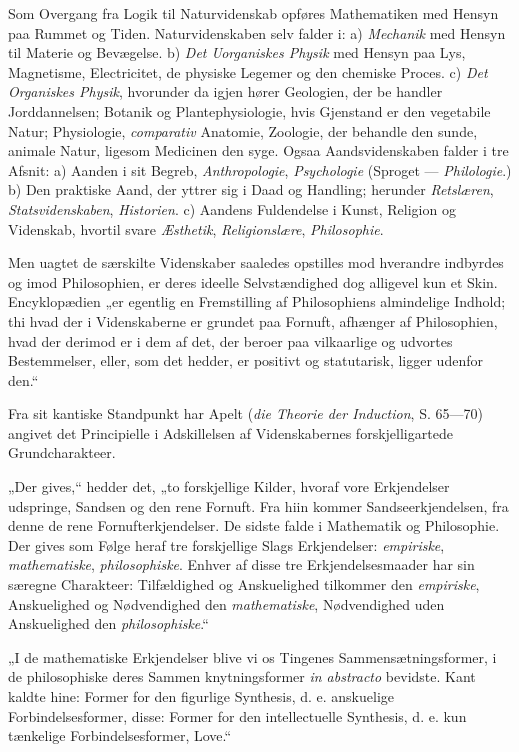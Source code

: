\documentclass[12pt]{book}
\newcommand{\opage}[1]{\marginnote{\footnotesize\textit{[#1]}}}
\begin{document}
Som Overgang fra Logik til Naturvidenskab opføres Mathematiken med Hensyn paa Rummet og
Tiden. Naturvidenskaben selv falder i: a) \emph{Mechanik} med Hensyn til Materie og
Bevægelse. b) \emph{Det Uorganiskes Physik} med Hensyn paa Lys, Magnetisme,
Electricitet, de physiske Legemer og den chemiske Proces. c) \emph{Det Organiskes
Physik}, hvorunder da igjen hører Geologien, der be%
\opage{85}handler Jorddannelsen; Botanik og Plantephysiologie, hvis Gjenstand er den vegetabile
Natur; Physiologie, \emph{comparativ} Anatomie, Zoologie, der behandle den sunde, animale
Natur, ligesom Medicinen den syge. Ogsaa Aandsvidenskaben falder i tre Afsnit: a) Aanden
i sit Begreb, \emph{Anthropologie}, \emph{Psychologie} (Sproget — \emph{Philologie}.) b) Den
praktiske Aand, der yttrer sig i Daad og Handling; herunder \emph{Retslæren},
\emph{Statsvidenskaben}, \emph{Historien}. c) Aandens Fuldendelse i Kunst, Religion og
Videnskab, hvortil svare \emph{Æsthetik}, \emph{Religionslære}, \emph{Philosophie}.

Men uagtet de særskilte Videnskaber saaledes opstilles mod hverandre indbyrdes og imod
Philosophien, er deres ideelle Selvstændighed dog alligevel kun et Skin. Encyklopædien
„er egentlig en Fremstilling af Philosophiens almindelige Indhold; thi hvad der i
Videnskaberne er grundet paa Fornuft, afhænger af Philosophien, hvad der derimod er i dem
af det, der beroer paa vilkaarlige og udvortes Bestemmelser, eller, som det hedder, er
positivt og statutarisk, ligger udenfor den.“

Fra sit kantiske Standpunkt har Apelt (\textit{die Theorie der Induction}, S. 65—70)
angivet det Principielle i Adskillelsen af Videnskabernes forskjelligartede
Grundcharakteer.

„Der gives,“ hedder det, „to forskjellige Kilder, hvoraf vore Erkjendelser udspringe,
Sandsen og den rene Fornuft. Fra hiin kommer Sandseerkjendelsen, fra denne de rene
Fornufterkjendelser. De sidste falde i Mathematik og Philosophie. Der gives som Følge
heraf tre forskjellige Slags Erkjendelser: \emph{empiriske}, \emph{mathematiske},
\emph{philosophiske}. Enhver af disse tre Erkjendelsesmaader har sin særegne Charakteer:
Tilfældighed og Anskuelighed tilkommer den \emph{empiriske}, Anskuelighed og Nødvendighed
den \emph{mathematiske}, Nødvendighed uden Anskuelighed den \emph{philosophiske}.“

„I de mathematiske Erkjendelser blive vi os Tingenes Sammensætningsformer, i de
philosophiske deres Sammen%
\opage{86}knytningsformer \textit{in abstracto} bevidste. Kant kaldte hine: Former for den figurlige
Synthesis, d. e. anskuelige Forbindelsesformer, disse: Former for den intellectuelle
Synthesis, d. e. kun tænkelige Forbindelsesformer, Love.“
\end{document}
